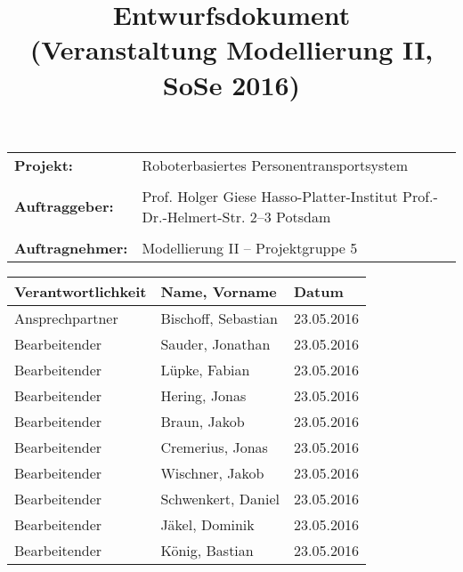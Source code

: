 \documentclass[includeheaders]{scrartcl}
\begin{document}
	
	
	
	\newpage
	
	\title{Entwurfsdokument\\ \small{(Veranstaltung Modellierung II, SoSe 2016)}}
	\date{}
	\author{}
	
	\maketitle
	\begin{table}[H]
		\centering
		\begin{tabular}{lp{7.5cm}}
			\textbf{Projekt:} & Roboterbasiertes Personentransportsystem\\
			&\\
			\textbf{Auftraggeber: }& Prof. Holger Giese \newline Hasso-Platter-Institut \newline Prof.-Dr.-Helmert-Str. 2–3 \newline 14482 Potsdam\\
			&\\
			\textbf{Auftragnehmer: }& Modellierung II – Projektgruppe 5 \\
		\end{tabular}
	\end{table}
	
	
	
	\newpage
	
	\begin{table}[H]
		\centering
		\begin{tabularx}{\textwidth}{|p{4cm}|X|p{4cm}|}
			\hline
			Verantwortlichkeit & Name, Vorname & Datum \\ \hline
			Ansprechpartner    & Bischoff, Sebastian & 23.05.2016 \\
			Bearbeitender      & Sauder, Jonathan & 23.05.2016 \\ 
			Bearbeitender      & Lüpke, Fabian & 23.05.2016 \\ 
			Bearbeitender      & Hering, Jonas & 23.05.2016 \\
			Bearbeitender      & Braun, Jakob & 23.05.2016  \\
			Bearbeitender      & Cremerius, Jonas & 23.05.2016 \\
			Bearbeitender      & Wischner, Jakob & 23.05.2016 \\
			Bearbeitender      & Schwenkert, Daniel & 23.05.2016 \\
			Bearbeitender      & Jäkel, Dominik & 23.05.2016 \\
			Bearbeitender      & König, Bastian & 23.05.2016 \\ \hline
		\end{tabularx}
	\end{table}
	
	\newpage
	
	\tableofcontents

\newpage

\newpage

\newpage

\newpage

\newpage

\newpage

\newpage

\newpage

\newpage

\end{document}
